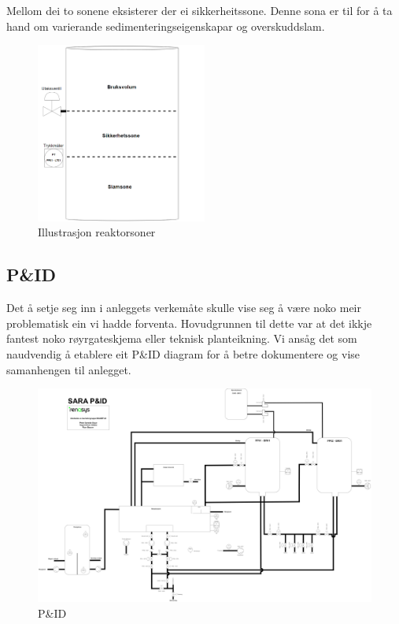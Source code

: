 Mellom dei to sonene eksisterer der ei sikkerheitssone.
Denne sona er til for å ta hand om varierande sedimenteringseigenskapar
og overskuddslam. \newline

\begin{figure}[htbp]
    \centering
    \includegraphics[width=0.5\textwidth]{Figurar/Reaktorsoner.png}
    \caption{Illustrasjon reaktorsoner}\label{fig:reaktorsoner}
\end{figure}

\subsection{P\&ID}

Det å setje seg inn i anleggets verkemåte skulle vise seg å være noko meir problematisk ein vi hadde forventa.
Hovudgrunnen til dette var at det ikkje fantest noko røyrgateskjema eller teknisk planteikning.
Vi ansåg det som naudvendig å etablere eit P\&ID diagram for å betre dokumentere og vise samanhengen til anlegget.

\begin{figure}[htbp]
    \centering
    \includegraphics[angle=90,width=1\textwidth]{Figurar/P&ID.drawio.png}
    \caption{P\&ID}\label{fig:HMI}
\end{figure}
